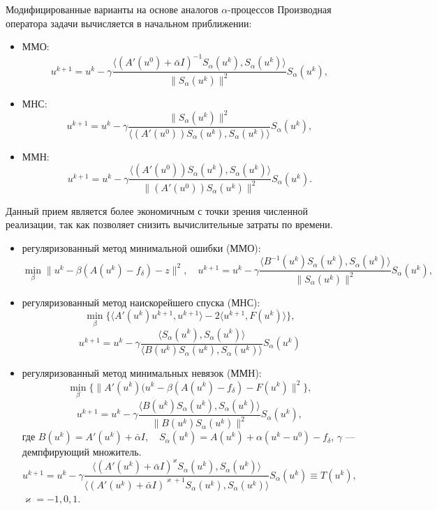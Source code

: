 \documentclass[10pt,pdf, mathserif, hyperref={unicode}]{beamer}
\begin{document}
\begin{frame}{Модифицированные варианты на основе аналогов $\alpha$-процессов}
	Производная оператора задачи вычисляется 
	в начальном приближении:
	\begin{itemize}
		\item ММО: $$u^{k+1}=u^k-\gamma\frac{\big\langle(A'(u^0)+\bar{\alpha}I)^{-1}S_\alpha(u^k),S_\alpha(u^k)\big\rangle}{\|S_\alpha(u^k)\|^2}S_\alpha(u^k),$$
		\item МНС:
		$$u^{k+1}=u^k-\gamma\frac{\|S_\alpha(u^k)\|^2}{\big\langle(A'(u^0))S_\alpha(u^k), S_\alpha(u^k)\big\rangle}S_\alpha(u^k),$$
		\item ММН:
		$$u^{k+1}=u^k-\gamma\frac{\big\langle(A'(u^0))S_\alpha(u^k), S_\alpha(u^k)\big\rangle}{\|(A'(u^0))S_\alpha(u^k)\|^2}S_\alpha(u^k).$$
	\end{itemize}
	
	\smallskip
	Данный прием является более экономичным с точки зрения численной реализации, так как позволяет снизить вычислительные затраты по времени.
	\let\thefootnote\relax\let\thefootnote\relax{}
\end{frame}

\begin{frame}
	\begin{itemize}
		\item регуляризованный метод минимальной ошибки (ММО): $$\min_{\beta}{\|u^k-\beta(A(u^k)-f_{\delta})-z\|^2},\quad u^{k+1} =u^k - \gamma\frac{\langle B^{-1}(u^k)S_\alpha(u^k), S_\alpha (u^k)\rangle}{\|S_\alpha(u^k)\|^2}S_\alpha(u^k),$$
		\item регуляризованный метод наискорейшего спуска (МНС):
		$$\min_{\beta}\{\langle A'(u^k)u^{k+1},u^{k+1}\rangle -2\langle u^{k+1},F(u^k)\rangle \},$$
		$$ u^{k+1} =u^k - \gamma\frac{\langle S_\alpha(u^k), S_\alpha (u^k)\rangle}{\langle B(u^k)S_\alpha(u^k), S_\alpha(u^k)\rangle}S_\alpha(u^k)$$
		\item регуляризованный метод минимальных невязок (ММН):
		$$\min_{\beta}\{\|A'(u^k)(u^k-\beta(A(u^k)-f_{\delta})-F(u^k)\|^2\},$$$$ u^{k+1} =u^k - \gamma\frac{\langle B(u^k)S_\alpha(u^k), S_\alpha (u^k)\rangle}{\|B(u^k)S_\alpha(u^k)\|^2}S_\alpha(u^k),$$
		\vskip 3mm
		где $B(u^k)=A'(u^k)+\bar{\alpha}I, \quad S_\alpha(u^k)=A(u^k)+\alpha(u^k-u^0)-f_\delta$, 
		\vskip 2mm
		$\gamma$ --- демпфирующий множитель.
		$$ u^{k+1}=u^k-\gamma\frac{\langle(A'(u^k)+\bar\alpha I)^{\varkappa}S_\alpha(u^k), S_\alpha(u^k)\rangle}{\langle(A'(u^k)+\bar\alpha I)^{\varkappa+1}S_\alpha(u^k), S_\alpha(u^k)\rangle}S_\alpha(u^k)\equiv{T(u^k)},$$
		$\varkappa=-1,0,1$.
	\end{itemize}
\end{frame}
\end{document}
